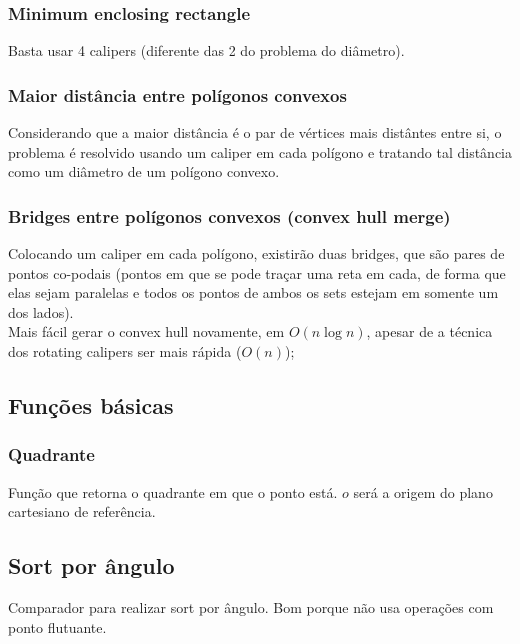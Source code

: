 \subsubsection{Minimum enclosing rectangle}
Basta usar 4 calipers (diferente das 2 do problema do di\^{a}metro).
\divisor

\subsubsection{Maior dist\^{a}ncia entre pol\'{i}gonos convexos}
Considerando que a maior dist\^{a}ncia \'{e} o par de v\'{e}rtices mais dist\^{a}ntes entre si, o problema \'{e}  resolvido usando um caliper em cada pol\'{i}gono e tratando tal dist\^{a}ncia como um di\^{a}metro de um pol\'{i}gono convexo.
\divisor

\subsubsection{Bridges entre pol\'{i}gonos convexos (convex hull merge)}
Colocando um caliper em cada pol\'{i}gono, existir\~{a}o duas bridges, que s\~{a}o pares de pontos co-podais (pontos em que se pode tra\c{c}ar uma reta em cada, de forma que elas sejam paralelas e todos os pontos de ambos os sets estejam em somente um dos lados).
\\ Mais f\'{a}cil gerar o convex hull novamente, em $O(n \log{n})$, apesar de a t\'{e}cnica dos rotating calipers ser mais r\'{a}pida ($O(n)$);
\divisor

\subsection{Fun\c{c}\~{o}es b\'{a}sicas}
\subsubsection{Quadrante}
Fun\c{c}\~{a}o que retorna o quadrante em que o ponto est\'{a}. $o$ ser\'{a} a origem do plano cartesiano de refer\^{e}ncia.
\divisor

\subsection{Sort por \^{a}ngulo}
Comparador para realizar sort por \^{a}ngulo. Bom porque n\~{a}o usa opera\c{c}\~{o}es com ponto flutuante.
\divisor
